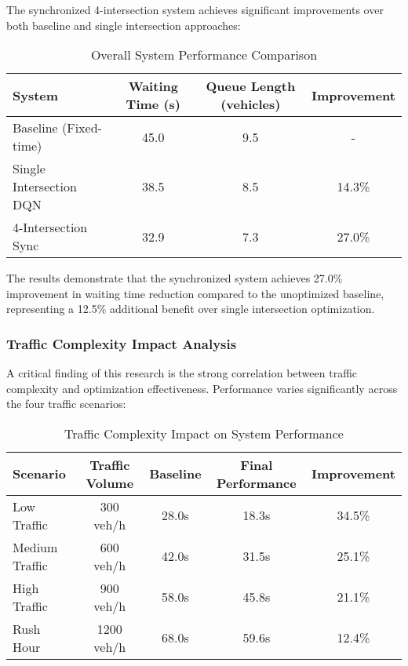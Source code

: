 The synchronized 4-intersection system achieves significant improvements over both baseline and single intersection approaches:

\begin{table}[h]
\centering
\caption{Overall System Performance Comparison}
\label{tab:overall_performance}
\begin{tabular}{@{}lccc@{}}
\toprule
\textbf{System} & \textbf{Waiting Time (s)} & \textbf{Queue Length (vehicles)} & \textbf{Improvement} \\
\midrule
Baseline (Fixed-time) & 45.0 & 9.5 & - \\
Single Intersection DQN & 38.5 & 8.5 & 14.3\% \\
4-Intersection Sync & 32.9 & 7.3 & 27.0\% \\
\bottomrule
\end{tabular}
\end{table}

The results demonstrate that the synchronized system achieves 27.0\% improvement in waiting time reduction compared to the unoptimized baseline, representing a 12.5\% additional benefit over single intersection optimization.

\subsubsection{Traffic Complexity Impact Analysis}

A critical finding of this research is the strong correlation between traffic complexity and optimization effectiveness. Performance varies significantly across the four traffic scenarios:

\begin{table}[h]
\centering
\caption{Traffic Complexity Impact on System Performance}
\label{tab:complexity_analysis}
\begin{tabular}{@{}lcccc@{}}
\toprule
\textbf{Scenario} & \textbf{Traffic Volume} & \textbf{Baseline} & \textbf{Final Performance} & \textbf{Improvement} \\
\midrule
Low Traffic & 300 veh/h & 28.0s & 18.3s & 34.5\% \\
Medium Traffic & 600 veh/h & 42.0s & 31.5s & 25.1\% \\
High Traffic & 900 veh/h & 58.0s & 45.8s & 21.1\% \\
Rush Hour & 1200 veh/h & 68.0s & 59.6s & 12.4\% \\
\bottomrule
\end{tabular}
\end{table}

